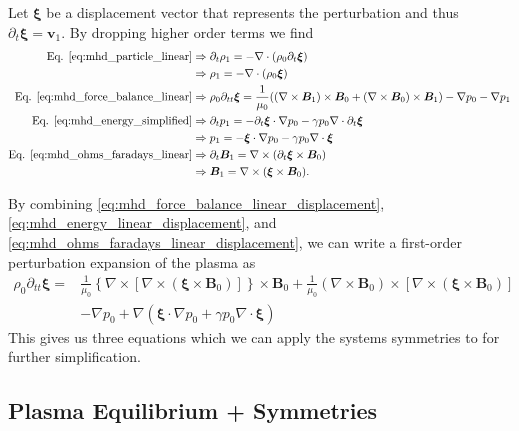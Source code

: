 Let $\bm{\xi}$ be a displacement vector that represents the perturbation and thus $\partial_t \bm{\xi} = \bm{v}_1$. By dropping higher order terms we find
\begin{align}
  \textrm{Eq. } \ref{eq:mhd_particle_linear} &\Rightarrow \partial_t \rho_1 = - \nabla \cdot (\rho_0 \partial_t \bm{\xi}) \nonumber \\
  &\Rightarrow \rho_1 = - \nabla \cdot (\rho_0 \bm{\xi}) \label{eq:mhd_particle_linear_displacement}\\
  \textrm{Eq. } \ref{eq:mhd_force_balance_linear} &\Rightarrow \rho_0 \partial_{tt} \bm{\xi} = \frac{1}{\mu_0} ((\nabla \times \bm{B}_1) \times \bm{B}_0 + (\nabla \times \bm{B}_0) \times \bm{B}_1) - \nabla p_0 - \nabla p_1 \label{eq:mhd_force_balance_linear_displacement}\\
  \textrm{Eq. } \ref{eq:mhd_energy_simplified} &\Rightarrow \partial_t p_1 = -\partial_t \bm{\xi} \cdot \nabla p_0 -\gamma p_0 \nabla \cdot \partial_t \bm{\xi} \nonumber \\
  &\Rightarrow p_1 = -\bm{\xi} \cdot \nabla p_0 -\gamma p_0 \nabla \cdot \bm{\xi} \label{eq:mhd_energy_linear_displacement}\\
  \textrm{Eq. } \ref{eq:mhd_ohms_faradays_linear} &\Rightarrow \partial_t \bm{B}_1 = \nabla \times (\partial_t \bm{\xi} \times \bm{B}_0) \nonumber \\ 
  &\Rightarrow \bm{B}_1 = \nabla \times (\bm{\xi} \times \bm{B}_0) \label{eq:mhd_ohms_faradays_linear_displacement}.
\end{align}

By combining \ref{eq:mhd_force_balance_linear_displacement}, \ref{eq:mhd_energy_linear_displacement}, and \ref{eq:mhd_ohms_faradays_linear_displacement}, we can write a first-order perturbation expansion of the plasma as
\begin{align}
  \rho_0 \partial_{tt} \bm{\xi} =& \frac{1}{\mu_0}\left\{\nabla \times \left[\nabla \times \left(\bm{\xi} \times \bm{B}_0\right)\right]\right\}\times \bm{B}_0 + \frac{1}{\mu_0} \left(\nabla \times \bm{B}_0\right) \times \left[\nabla \times \left(\bm{\xi} \times \bm{B}_0\right)\right] \nonumber \\
  &- \nabla p_0 + \nabla \left(\bm{\xi} \cdot \nabla p_0 + \gamma p_0 \nabla \cdot \bm{\xi}\right)
  \label{eq:first_order_mhd}
\end{align}
This gives us three equations which we can apply the systems symmetries to for further simplification.

\subsection{Plasma Equilibrium + Symmetries}

